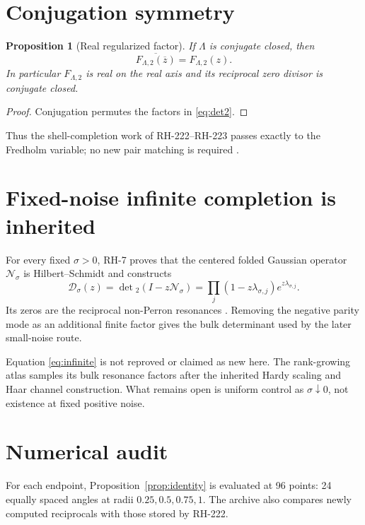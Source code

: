 \documentclass[11pt]{article}
\newtheorem{proposition}[theorem]{Proposition}
\theoremstyle{remark}\newtheorem{remark}[theorem]{Remark}
\begin{document}
\section{Conjugation symmetry}

\begin{proposition}[Real regularized factor]\label{prop:real}
If $\Lambda$ is conjugate closed, then
\[
 \overline{F_{\Lambda,2}(\overline z)}=F_{\Lambda,2}(z).
\]
In particular $F_{\Lambda,2}$ is real on the real axis and its reciprocal
zero divisor is conjugate closed.
\end{proposition}
\begin{proof}
Conjugation permutes the factors in \eqref{eq:det2}.
\end{proof}

Thus the shell-completion work of RH-222--RH-223 passes exactly to the
Fredholm variable; no new pair matching is required
\citep{WangRH222,WangRH223}.

\section{Fixed-noise infinite completion is inherited}

For every fixed $\sigma>0$, RH-7 proves that the centered folded Gaussian
operator $\mathcal N_\sigma$ is Hilbert--Schmidt and constructs
\begin{equation}\label{eq:infinite}
 \mathcal D_\sigma(z)
 =\det{}_2(I-z\mathcal N_\sigma)
 =\prod_j(1-z\lambda_{\sigma,j})e^{z\lambda_{\sigma,j}}.
\end{equation}
Its zeros are the reciprocal non-Perron resonances
\citep{WangRH7,Simon2005}. Removing the negative parity mode as an additional
finite factor gives the bulk determinant used by the later small-noise route.

Equation \eqref{eq:infinite} is not reproved or claimed as new here. The
rank-growing atlas samples its bulk resonance factors after the inherited
Hardy scaling and Haar channel construction. What remains open is uniform
control as $\sigma\downarrow0$, not existence at fixed positive noise.

\section{Numerical audit}

For each endpoint, Proposition~\ref{prop:identity} is evaluated at 96 points:
24 equally spaced angles at radii $0.25,0.5,0.75,1$. The archive also compares
newly computed reciprocals with those stored by RH-222.
\end{document}
